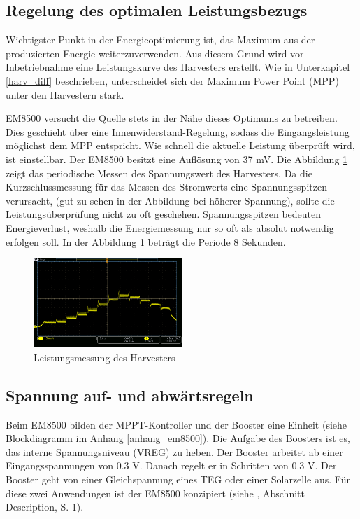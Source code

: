 \subsection{Regelung des optimalen Leistungsbezugs}
\label{optimaleLeistung}

Wichtigster Punkt in der Energieoptimierung ist, das Maximum aus der produzierten Energie weiterzuverwenden. Aus diesem Grund wird vor Inbetriebnahme eine Leistungskurve des Harvesters erstellt. Wie in Unterkapitel \ref{harv_diff} beschrieben, unterscheidet sich der Maximum Power Point (MPP) unter den Harvestern stark.

EM8500 versucht die Quelle stets in der Nähe dieses Optimums zu betreiben. Dies geschieht über eine Innenwiderstand-Regelung, sodass die Eingangsleistung möglichst dem MPP entspricht. Wie schnell die aktuelle Leistung überprüft wird, ist einstellbar. Der EM8500 besitzt eine Auflösung von 37 mV. Die Abbildung \ref{RegelungSpannung} zeigt das periodische Messen des Spannungswert des Harvesters. Da die Kurzschlussmessung für das Messen des Stromwerts eine Spannungsspitzen verursacht, (gut zu sehen in der Abbildung bei höherer Spannung), sollte die Leistungsüberprüfung nicht zu oft geschehen. Spannungsspitzen bedeuten Energieverlust, weshalb die Energiemessung nur so oft als  absolut notwendig erfolgen soll. In der Abbildung \ref{RegelungSpannung} beträgt die Periode 8 Sekunden. 

\begin{figure}[ht]
    \includegraphics[width=0.5\textwidth]{2TheoretischeGrundlagen/imag/RegelungVHRV.png}
    \caption{Leistungsmessung des Harvesters}
    \label{RegelungSpannung} 
\end{figure}


\subsection{Spannung auf- und abwärtsregeln}
\label{eingangsspannung}


Beim EM8500 bilden der MPPT-Kontroller und der Booster eine Einheit (siehe Blockdiagramm im Anhang \ref{anhang_em8500}). Die Aufgabe des Boosters ist es, das interne Spannungsniveau (VREG) zu heben. Der Booster arbeitet ab einer Eingangsspannungen von 0.3 V. Danach regelt er in Schritten von 0.3 V. Der Booster geht von einer Gleichspannung eines TEG oder einer Solarzelle aus. Für diese zwei Anwendungen ist der EM8500 konzipiert (siehe \cite{datasheet_EM85}, Abschnitt Description, S. 1).


